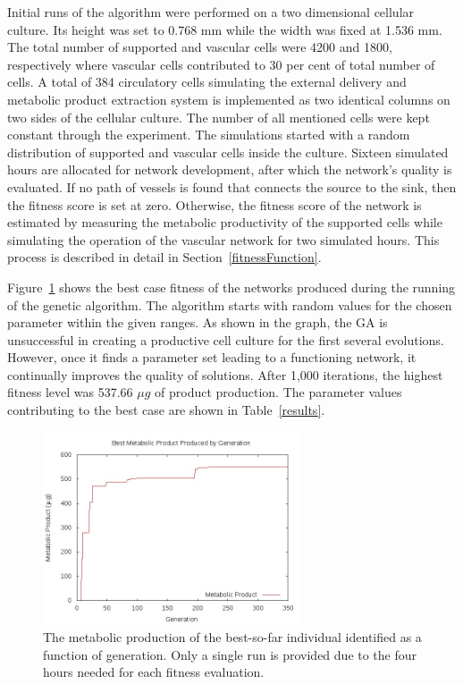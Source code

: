 Initial runs of the algorithm were performed on a two dimensional cellular culture.
Its height was set to 0.768 mm while the width was fixed at 1.536 mm. The total
number of supported and vascular cells were 4200 and 1800, respectively where
vascular cells contributed to 30 per cent of total number of cells. A total of 384
circulatory cells simulating the external delivery and metabolic product extraction
system is implemented as two identical columns on two sides of the cellular culture.
The number of all mentioned cells were kept constant through the experiment. The
simulations started with a random distribution of supported and vascular cells inside
the culture. Sixteen simulated hours are allocated for network development, after
which the network's quality is evaluated. If no path of vessels is found that
connects the source to the sink, then the fitness score is set at zero. Otherwise,
the fitness score of the network is estimated by measuring the metabolic productivity
of the supported cells while simulating the operation of the vascular network for two
simulated hours. This process is described in detail in Section~\ref{fitnessFunction}.


Figure~\ref{evolutions} shows the best case fitness of the networks produced during
the running of the genetic algorithm. The algorithm starts with random values for the
chosen parameter within the given ranges. As shown in the graph, the GA is
unsuccessful in creating a productive cell culture for the first several evolutions.
However, once it finds a parameter set leading to a functioning network, it
continually improves the quality of solutions. After 1,000 iterations, the highest
fitness level was 537.66 $\mu g$ of product production. The parameter values
contributing to the best case are shown in Table~\ref{results}.

\begin{figure}[!t]
    \centering
    \includegraphics[width=3in]{./results/evolution products.jpg}

    \caption{The metabolic production of the best-so-far individual identified as a
    function of generation. Only a single run is provided due to the four hours
    needed for each fitness evaluation.}
    \label{evolutions}
\end{figure}



